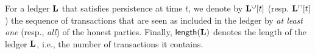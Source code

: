 For a ledger $\mathbf{L}$ that satisfies persistence at time $t$, we denote by $\mathbf{L}^{\cup}[t]$ (resp.
$\mathbf{L}^{\cap}[t]$) the sequence of transactions that are seen as
included in the ledger by \emph{at least one} (resp., \emph{all}) of the honest
parties. Finally, $\mathsf{length}(\mathbf{L})$ denotes the length of the ledger $\mathbf{L}$,
i.e., the number of transactions it contains.
